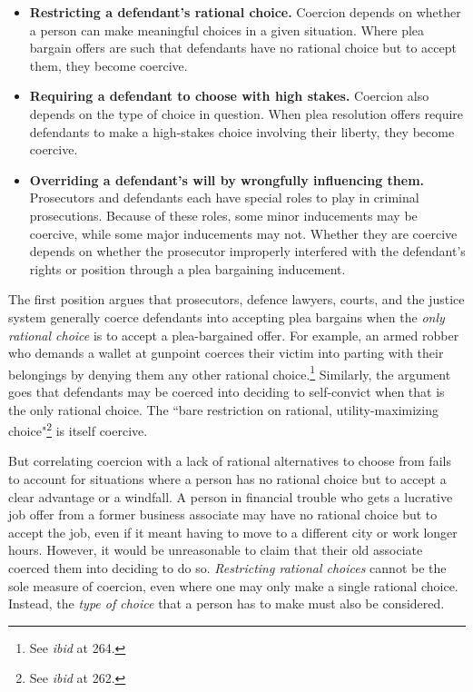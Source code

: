 \begin{itemize}
    \item \textbf{Restricting a defendant's rational choice.} Coercion depends on whether a person can make meaningful choices in a given situation. Where plea bargain offers are such that defendants have no rational choice but to accept them, they become coercive.
    \item \textbf{Requiring a defendant to choose with high stakes.} Coercion also depends on the type of choice in question. When plea resolution offers require defendants to make a high-stakes choice involving their liberty, they become coercive.
    \item \textbf{Overriding a defendant's will by wrongfully influencing them.} Prosecutors and defendants each have special roles to play in criminal prosecutions. Because of these roles, some minor inducements may be coercive, while some major inducements may not. Whether they are coercive depends on whether the prosecutor improperly interfered with the defendant's rights or position through a plea bargaining inducement.
\end{itemize}
The first position argues that prosecutors, defence lawyers, courts, and the justice system generally coerce defendants into accepting plea bargains when the \textit{only rational choice} is to accept a plea-bargained offer. For example, an armed robber who demands a wallet at gunpoint coerces their victim into parting with their belongings by denying them any other rational choice.\footnote{See \textit{ibid} at 264.} Similarly, the argument goes that defendants may be coerced into deciding to self-convict when that is the only rational choice. The ``bare restriction on rational, utility-maximizing choice"\footnote{See \textit{ibid} at 262.} is itself coercive. 

But correlating coercion with a lack of rational alternatives to choose from fails to account for situations where a person has no rational choice but to accept a clear advantage or a windfall. A person in financial trouble who gets a lucrative job offer from a former business associate may have no rational choice but to accept the job, even if it meant having to move to a different city or work longer hours. However, it would be unreasonable to claim that their old associate coerced them into deciding to do so. \textit{Restricting rational choices} cannot be the sole measure of coercion, even where one may only make a single rational choice. Instead, the \textit{type of choice} that a person has to make must also be considered.

